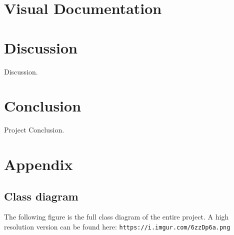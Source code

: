 \documentclass[12p]{article}
\begin{document}

\newpage
\section{Visual Documentation}

\newpage
\section{Discussion}

Discussion.


\newpage
\section{Conclusion}

Project Conclusion.


\newpage
\printbibliography[heading=bibintoc,title={References}]


\newpage
\appendix

\section{Appendix}

\subsection{Class diagram} \label{AppendixClassDiagramFull}

The following figure is the full class diagram of the entire project. A high resolution version can be found here: \texttt{https://i.imgur.com/6zzDp6a.png}
\end{document}
